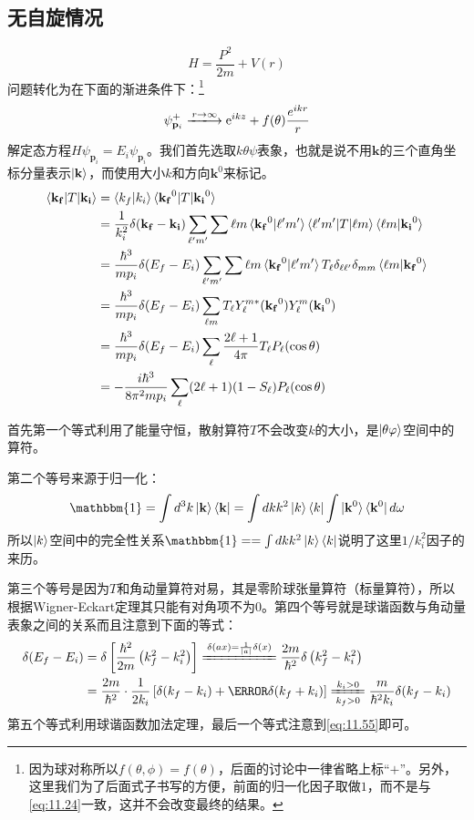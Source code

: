 \documentclass[a4paper,zihao=-4,linespread=1]{ctexrep}
\begin{document}
	\subsection{无自旋情况}
	\[H=\frac{P^2}{2m}+V(r)\]
	问题转化为在下面的渐进条件下：\footnote{因为球对称所以$f(\theta,\phi)=f(\theta)$，后面的讨论中一律省略上标“$+$”。另外，这里我们为了后面式子书写的方便，前面的归一化因子取做$1$，而不是与\ref{eq:11.24}一致，这并不会改变最终的结果。}
	\[\psi_{\mathbf{p}_i}^+\xlongrightarrow{r\to\infty}\mathrm{e}^{ikz}+f(\theta)\frac{e^{ikr}}{r}\]
	解定态方程$H\psi_{\mathbf{p}_i}=E_i\psi_{\mathbf{p}_i}$。我们首先选取$k\theta\psi$表象，也就是说不用$\mathbf{k}$的三个直角坐标分量表示$\ket{\mathbf{k}}$，而使用大小$k$和方向$\mathbf{k}^0$来标记。
	\begin{equation}
		\begin{aligned}
			\braket{\mathbf{k_f}|T|\mathbf{k_i}}&=\braket{{k_f}|{k_i}}\braket{\mathbf{k_f}^0|T|\mathbf{k_i}^0}\\
			&=\frac{1}{k_i^2}\delta(\mathbf{k_f}-\mathbf{k_i})\sum_{\ell^\prime m^\prime}\sum{\ell m}\braket{\mathbf{k_f}^0|\ell^\prime m^\prime}\braket{\ell^\prime m^\prime |T |\ell m}\braket{\ell m|\mathbf{k_i}^0}\\
			&=\frac{\hbar^3}{m p_i}\delta(E_f-E_i)\sum_{\ell^\prime m^\prime}\sum{\ell m}\braket{\mathbf{k_f}^0|\ell^\prime m^\prime}T_\ell\delta_{\ell\ell^\prime}\delta_{mm}\braket{\ell m|\mathbf{k_f}^0}\\
			&=\frac{\hbar^3}{m p_i}\delta(E_f-E_i)\sum_{\ell m} T_\ell Y^{m*}_\ell(\mathbf{k_f}^0)Y^{m}_\ell(\mathbf{k_i}^0)\\
			&=\frac{\hbar^3}{m p_i}\delta(E_f-E_i)\sum_\ell\frac{2\ell+1}{4\pi}T_\ell P_\ell(\cos\theta)\\
			&=-\frac{i\hbar^3}{8\pi^2m p_i}\sum_\ell (2\ell+1)(1-S_\ell)P_\ell(\cos\theta)
		\end{aligned}
	\end{equation}
	
	首先第一个等式利用了能量守恒，散射算符$T$不会改变$k$的大小，是$\ket{\theta\varphi}$空间中的算符。
	
	第二个等号来源于归一化：
	\[\mathbbm{1}=\int d^3k\ket{\mathbf{k}}\bra{\mathbf{k}}=\int dkk^2\ket{{k}}\bra{{k}}\int \ket{\mathbf{k}^0}\bra{\mathbf{k}^0}d\omega\]
	所以$\ket{k}$空间中的完全性关系$\mathbbm{1}==\int dkk^2\ket{{k}}\bra{{k}}$说明了这里$1/k^2_i$因子的来历。
	
	第三个等号是因为$T$和角动量算符对易，其是零阶球张量算符（标量算符），所以根据Wigner-Eckart定理其只能有对角项不为0。第四个等号就是球谐函数与角动量表象之间的关系而且注意到下面的等式：
	\begin{equation}
		\begin{aligned}
			\delta(E_f-E_i)&=\delta\left[\frac{\hbar^2}{2m}\left(k_f^2-k_i^2\right)\right]\xlongequal{\delta(ax)=\frac{1}{|a|}\delta(x)}\frac{2m}{\hbar^2}\delta\left(k_f^2-k_i^2\right)\\
			&=\frac{2m}{\hbar^2}\cdot\frac{1}{2k_i}\left[\delta(k_f-k_i)+\cancel{\delta(k_f+k_i)}\right]\xlongequal[k_f>0]{k_i>0}\frac{m}{\hbar^2k_i}\delta(k_f-k_i)
		\end{aligned}
	\end{equation}
	第五个等式利用球谐函数加法定理，最后一个等式注意到\ref{eq:11.55}即可。
	
\end{document}
